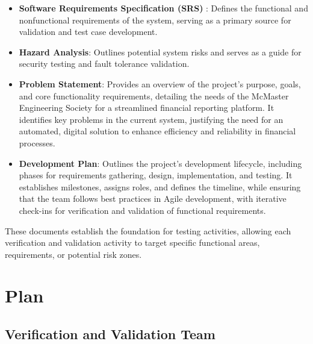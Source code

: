 \documentclass[12pt, titlepage]{article}
\begin{document}
\begin{itemize}
    \item \textbf{Software Requirements Specification (SRS)} \citep{SRS}: Defines the functional and nonfunctional requirements of the system, serving as a primary source for validation and test case development.
    \item \textbf{Hazard Analysis}\citep{HazardAnalysis}: Outlines potential system risks and serves as a guide for security testing and fault tolerance validation.
    \item \textbf{Problem Statement}\citep{ProblemStatement}: Provides an overview of the project's purpose, goals, and core functionality requirements, detailing the needs of the McMaster Engineering Society for a streamlined financial reporting platform. It identifies key problems in the current system, justifying the need for an automated, digital solution to enhance efficiency and reliability in financial processes.
    \item \textbf{Development Plan}\citep{DevelopmentPlan}: Outlines the project's development lifecycle, including phases for requirements gathering, design, implementation, and testing. It establishes milestones, assigns roles, and defines the timeline, while ensuring that the team follows best practices in Agile development, with iterative check-ins for verification and validation of functional requirements.
\end{itemize}

These documents establish the foundation for testing activities, allowing each verification and validation activity to target specific functional areas, requirements, or potential risk zones.

\section{Plan}


\subsection{Verification and Validation Team}

\end{document}
